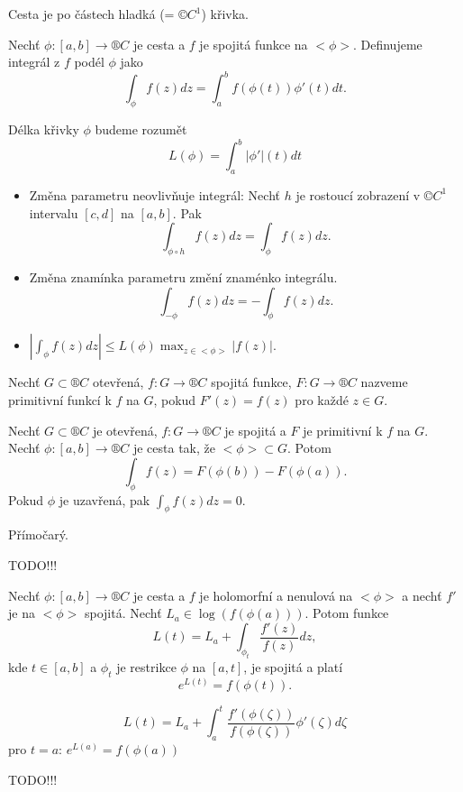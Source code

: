 \documentclass[12pt]{article}					%
\begin{document}
\begin{definice}[Cesta]
	Cesta je po částech hladká (= $©C^1$) křivka.
\end{definice}

\begin{definice}
	Nechť $\phi: [a, b] \rightarrow ®C$ je cesta a $f$ je spojitá funkce na $<\phi>$. Definujeme integrál z $f$ podél $\phi$ jako
	$$ \int_\phi f(z) dz = \int_a^b f(\phi(t))\phi'(t) dt. $$

	Délka křivky $\phi$ budeme rozumět
	$$ L(\phi) = \int_a^b |\phi'|(t)dt $$
\end{definice}

\begin{poznamka}
	\begin{itemize}
		\item Změna parametru neovlivňuje integrál: Nechť $h$ je rostoucí zobrazení v $©C^1$ intervalu $[c, d]$ na $[a, b]$. Pak
			$$ \int_{\phi \circ h} f(z) dz = \int_\phi f(z) dz. $$
		\item Změna znamínka parametru změní znaménko integrálu.
			$$ \int_{-\phi} f(z) dz = -\int_\phi f(z) dz. $$
		\item $|\int_\phi f(z)dz| ≤ L(\phi)\max_{z \in <\phi>}|f(z)|$.
	\end{itemize}
\end{poznamka}

\begin{definice}
	Nechť $G \subset ®C$ otevřená, $f: G \rightarrow ®C$ spojitá funkce, $F: G \rightarrow ®C$ nazveme primitivní funkcí k $f$ na $G$, pokud $F'(z) = f(z)$ pro každé $z \in G$.
\end{definice}

\begin{veta}
	Nechť $G \subset ®C$ je otevřená, $f: G \rightarrow ®C$ je spojitá a $F$ je primitivní k $f$ na $G$. Nechť $\phi: [a, b] \rightarrow ®C$ je cesta tak, že $<\phi> \subset G$. Potom
	$$ \int_\phi f(z) = F(\phi(b)) - F(\phi(a)). $$
	Pokud $\phi$ je uzavřená, pak $\int_\phi f(z) dz = 0$.

	\begin{dukazin}
		Přímočarý.
	\end{dukazin}
\end{veta}


TODO!!!


\begin{veta}
	Nechť $\phi: [a, b] \rightarrow ®C$ je cesta a $f$ je holomorfní a nenulová na $<\phi>$ a nechť $f'$ je na $<\phi>$ spojitá. Nechť $L_a \in \log(f(\phi(a)))$. Potom funkce
	$$ L(t) = L_a + \int_{\phi_t} \frac{f'(z)}{f(z)}dz, $$
	kde $t \in [a, b]$ a $\phi_t$ je restrikce $\phi$ na $[a, t]$, je spojitá a platí
	$$ e^{L(t)} = f(\phi(t)). $$

	\begin{dukazin}
		$$ L(t) = L_a + \int_a^t \frac{f'(\phi(\zeta))}{f(\phi(\zeta))} \phi'(\zeta) d\zeta $$
		pro $t = a$: $e^{L(a)} = f(\phi(a))$
	\end{dukazin}
\end{veta}

TODO!!!
\end{document}
